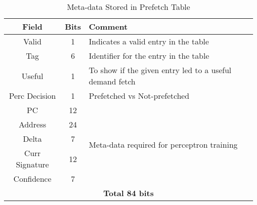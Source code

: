 \begin{table}[]
    \centering
    \begin{tabular}{|c|c|m{4.8cm}|}
    \hline
        \textbf{Field} &
        \textbf{Bits} &
        \textbf{Comment} \\
    \hline
         Valid & 1 & Indicates a valid entry in the table\\
         Tag & 6 & Identifier for the entry in the table\\
         Useful & 1 & To show if the given entry led to a useful demand fetch\\
         Perc Decision & 1 & Prefetched vs Not-prefetched \\
    \hline
        PC & 12 & \multirow{5}{4.8cm}{Meta-data required for perceptron training}\\
        Address & 24 & \\
        Delta & 7 & \\
        Curr Signature & 12 & \\
        Confidence & 7 & \\
    \hline
        \multicolumn{3}{|c|}{\textbf{Total 84 bits}}\\
    \hline
    \end{tabular}
    \caption{Meta-data Stored in Prefetch Table}
    \label{tab:PTable_metadata}
\end{table}


